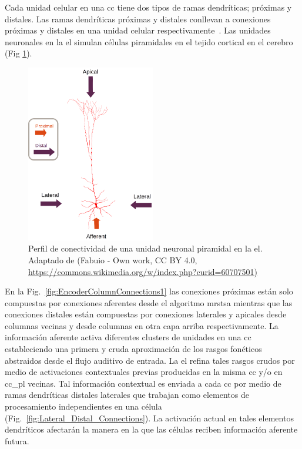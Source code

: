 {Cada unidad celular en una \gls{cc} tiene dos tipos de ramas dendríticas; próximas y distales. Las ramas dendríticas próximas y distales conllevan a conexiones próximas y distales en una unidad celular respectivamente~\cite{10.1371/journal.pone.0217966}.
Las unidades neuronales en la \gls{el} simulan células piramidales en el tejido cortical en el cerebro (Fig \ref{fig:Pyramidal_Cell}).

\begin{figure}[h!]
    \centering
    \includegraphics[width=0.5\textwidth]{Pyramidal_Cell.png}
    \caption{Perfil de conectividad de una unidad neuronal piramidal en la \gls{el}. Adaptado de (Fabuio - Own work, CC BY 4.0, \protect\url{https://commons.wikimedia.org/w/index.php?curid=60707501)}}
    \label{fig:Pyramidal_Cell}
\end{figure}

En la Fig.~\ref{fig:EncoderColumnConnections1} las conexiones próximas están solo compuestas por conexiones aferentes desde el algoritmo \gls{mrstsa} mientras que las conexiones distales están compuestas por conexiones laterales y apicales desde columnas vecinas y desde columnas en otra capa arriba respectivamente.
La información aferente activa diferentes clusters de unidades en una \gls{cc} estableciendo una primera y cruda aproximación de los rasgos fonéticos abstraidos desde el flujo auditivo de entrada. 
La \gls{el} refina tales rasgos crudos por medio de activaciones contextuales previas producidas en la misma \gls{cc} y/o en \gls{cc_pl} vecinas.
Tal información contextual es enviada a cada \gls{cc} por medio de ramas dendríticas distales laterales que trabajan como elementos de procesamiento independientes en una célula (Fig.~\ref{fig:Lateral_Distal_Connections}).
La activación actual en tales elementos dendríticos afectarán la manera en la que las células reciben información aferente futura.

}
